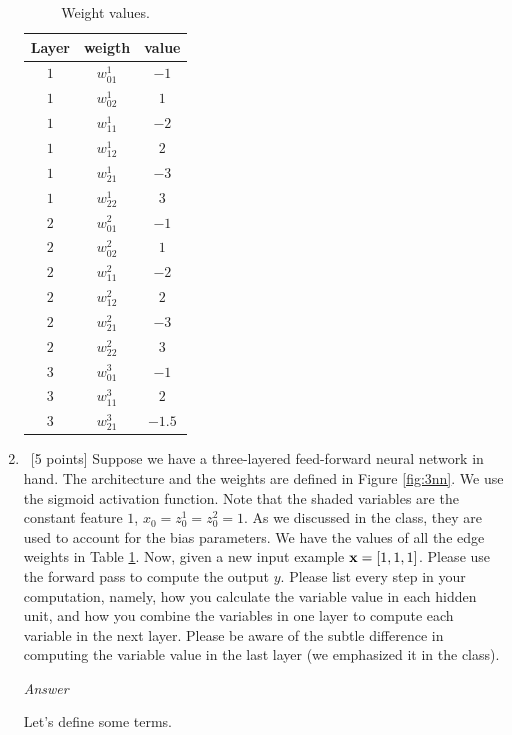 \documentclass[12pt, fullpage,letterpaper]{article}
\begin{document}
\begin{enumerate}
	\begin{table}[h]
		\centering
		\begin{tabular}{c|cc}
			Layer & weigth  & value\\ 
			\hline\hline
			$1$ & $w_{01}^1$ & $-1$ \\ \hline
			$1$ & $w_{02}^1$ & $1$ \\ \hline
			$1$ & $w_{11}^1$ & $-2$ \\ \hline
			$1$ & $w_{12}^1$ & $2$ \\ \hline
			$1$ & $w_{21}^1$ & $-3$ \\ \hline
			$1$ & $w_{22}^1$ & $3$ \\ \hline
			$2$ & $w_{01}^2$ & $-1$ \\ \hline
			$2$ & $w_{02}^2$ & $1$ \\ \hline
			$2$ & $w_{11}^2$ & $-2$ \\ \hline
			$2$ & $w_{12}^2$ & $2$ \\ \hline
			$2$ & $w_{21}^2$ & $-3$ \\ \hline
			$2$ & $w_{22}^2$ & $3$ \\ \hline
			$3$ & $w_{01}^3$ & $-1$ \\ \hline
			$3$ & $w_{11}^3$ & $2$ \\ \hline
			$3$ & $w_{21}^3$ & $-1.5$ \\ \hline
		\end{tabular}
		\caption{Weight values.}
		\label{tb:w}
	\end{table}
	
	\item~[5 points] Suppose we have a three-layered feed-forward neural network in hand. The architecture and the weights are defined in Figure \ref{fig:3nn}. We use the sigmoid activation function. Note that the shaded variables are the constant feature $1$, \ie $x_0 = z_{0}^1 = z_{0}^2 = 1$. As we discussed in the class, they are used to account for the bias parameters. 
	We have the values of all the edge weights in Table \ref{tb:w}. Now, given a new input example ${\bf x}=[1, 1, 1]$. Please use the forward pass to compute the output $y$. Please list every step in your computation, namely, how you calculate the variable value in each hidden unit, and how  you combine the variables in one layer to compute each variable in the next layer. Please be aware of the subtle difference in computing the variable value in the last layer (we emphasized it in the class). 
	
	\emph{Answer}
	
	Let's define some terms.
	

\end{enumerate}
\end{document}
